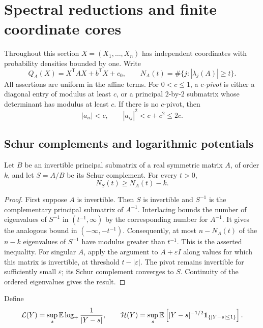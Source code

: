 \section{Spectral reductions and finite coordinate cores}
\label{sec:structure}

Throughout this section \(X=(X_1,\ldots,X_n)\) has independent
coordinates with probability densities bounded by one.  Write
\[
 Q_A(X)=X^{\mathsf T}AX+b^{\mathsf T}X+c_0,
 \qquad
 N_A(t)=\#\{j:|\lambda_j(A)|\geq t\}.
\]
All assertions are uniform in the affine terms.  For \(0<c\leq1\),
a \emph{\(c\)-pivot} is either a diagonal entry of modulus at least
\(c\), or a principal \(2\)-by-\(2\) submatrix whose determinant has
modulus at least \(c\).  If there is no \(c\)-pivot, then
\begin{equation}
 |a_{ii}|<c,\qquad |a_{ij}|^2<c+c^2\leq2c .
 \label{eq:no-pivot-entries}
\end{equation}

\subsection{Schur complements and logarithmic potentials}

\begin{lemma}
\label{lem:schur-count}
Let \(B\) be an invertible principal submatrix of a real symmetric
matrix \(A\), of order \(k\), and let \(S=A/B\) be its Schur
complement.  For every \(t>0\),
\[
 N_S(t)\geq N_A(t)-k.
\]
\end{lemma}
\begin{proof}
First suppose \(A\) is invertible.  Then \(S\) is invertible and
\(S^{-1}\) is the complementary principal submatrix of \(A^{-1}\).
Interlacing bounds the number of eigenvalues of \(S^{-1}\) in
\((t^{-1},\infty)\) by the corresponding number for \(A^{-1}\).
It gives the analogous bound in \((-\infty,-t^{-1})\).
Consequently, at most \(n-N_A(t)\) of the \(n-k\) eigenvalues of
\(S^{-1}\) have modulus greater than \(t^{-1}\).  This is the
asserted inequality.  For singular \(A\), apply the argument to
\(A+\varepsilon I\) along values for which this matrix is invertible,
at threshold \(t-|\varepsilon|\).  The pivot remains invertible
for sufficiently small \(\varepsilon\); its Schur complement
converges to \(S\).  Continuity of the ordered eigenvalues gives
the result.
\end{proof}


Define
\[
 {\cal L}(Y)=\sup_s\mathbb E\log_+\frac1{|Y-s|},
 \qquad
 {\cal H}(Y)=\sup_s\mathbb E\left[
 |Y-s|^{-1/2}\boldsymbol 1_{\{|Y-s|\leq1\}}\right].
\]

